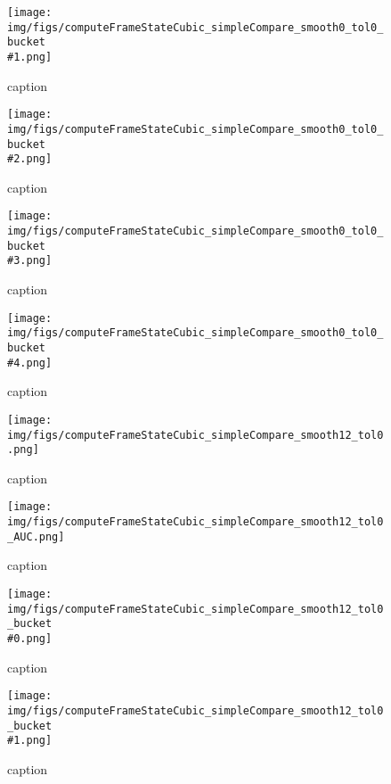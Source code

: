 %
\begin{figure}[!ht]
	\centering
	\texttt{[image: img/figs/computeFrameStateCubic\_simpleCompare\_smooth0\_tol0\_bucket\\\#1.png]}
	\caption{caption}
	\label{fig:computeFrameStateCubic_simpleCompare_smooth0_tol0_bucket\#1.png}
\end{figure}
%
\begin{figure}[!ht]
	\centering
	\texttt{[image: img/figs/computeFrameStateCubic\_simpleCompare\_smooth0\_tol0\_bucket\\\#2.png]}
	\caption{caption}
	\label{fig:computeFrameStateCubic_simpleCompare_smooth0_tol0_bucket\#2.png}
\end{figure}
%
\begin{figure}[!ht]
	\centering
	\texttt{[image: img/figs/computeFrameStateCubic\_simpleCompare\_smooth0\_tol0\_bucket\\\#3.png]}
	\caption{caption}
	\label{fig:computeFrameStateCubic_simpleCompare_smooth0_tol0_bucket\#3.png}
\end{figure}
%
\begin{figure}[!ht]
	\centering
	\texttt{[image: img/figs/computeFrameStateCubic\_simpleCompare\_smooth0\_tol0\_bucket\\\#4.png]}
	\caption{caption}
	\label{fig:computeFrameStateCubic_simpleCompare_smooth0_tol0_bucket\#4.png}
\end{figure}
%
\begin{figure}[!ht]
	\centering
	\texttt{[image: img/figs/computeFrameStateCubic\_simpleCompare\_smooth12\_tol0.png]}
	\caption{caption}
	\label{fig:computeFrameStateCubic_simpleCompare_smooth12_tol0.png}
\end{figure}
%
\begin{figure}[!ht]
	\centering
	\texttt{[image: img/figs/computeFrameStateCubic\_simpleCompare\_smooth12\_tol0\_AUC.png]}
	\caption{caption}
	\label{fig:computeFrameStateCubic_simpleCompare_smooth12_tol0_AUC.png}
\end{figure}
%
\begin{figure}[!ht]
	\centering
	\texttt{[image: img/figs/computeFrameStateCubic\_simpleCompare\_smooth12\_tol0\_bucket\\\#0.png]}
	\caption{caption}
	\label{fig:computeFrameStateCubic_simpleCompare_smooth12_tol0_bucket\#0.png}
\end{figure}
%
\begin{figure}[!ht]
	\centering
	\texttt{[image: img/figs/computeFrameStateCubic\_simpleCompare\_smooth12\_tol0\_bucket\\\#1.png]}
	\caption{caption}
	\label{fig:computeFrameStateCubic_simpleCompare_smooth12_tol0_bucket\#1.png}
\end{figure}

